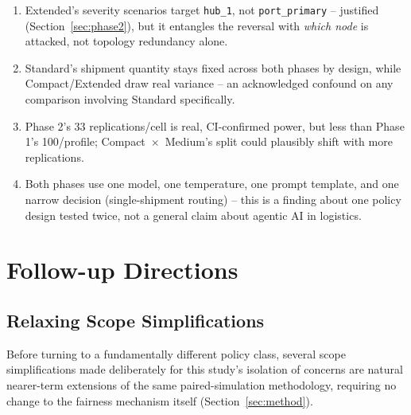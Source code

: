 \documentclass[10pt,twocolumn]{article}
\begin{document}
\begin{enumerate}[leftmargin=1.4em,itemsep=2pt,label=(\arabic*)]
\item Extended's severity scenarios target \texttt{hub\_1}, not \texttt{port\_primary} -- justified (Section~\ref{sec:phase2}), but it entangles the reversal with \emph{which node} is attacked, not topology redundancy alone.
\item Standard's shipment quantity stays fixed across both phases by design, while Compact/Extended draw real variance -- an acknowledged confound on any comparison involving Standard specifically.
\item Phase 2's 33 replications/cell is real, CI-confirmed power, but less than Phase 1's 100/profile; Compact~$\times$~Medium's split could plausibly shift with more replications.
\item Both phases use one model, one temperature, one prompt template, and one narrow decision (single-shipment routing) -- this is a finding about one policy design tested twice, not a general claim about agentic AI in logistics.
\end{enumerate}

\section{Follow-up Directions}
\label{sec:followup}

\subsection{Relaxing Scope Simplifications}
\label{sec:scope-followup}
Before turning to a fundamentally different policy class, several scope simplifications made deliberately for this study's isolation of concerns are natural nearer-term extensions of the same paired-simulation methodology, requiring no change to the fairness mechanism itself (Section~\ref{sec:method}).
\end{document}
